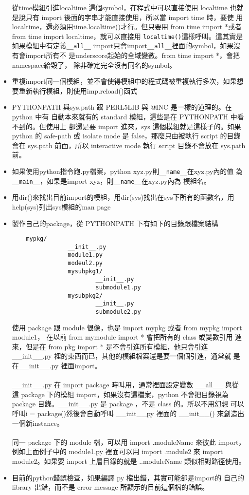 \begin{itemize}
	從time模組引進localtime 這個symbol，在程式中可以直接使用 localtime
	也就是說只有 import 後面的字串才能直接使用，所以當 import time 時，要使
	用 localtime，還必須用time.localtime()才行。但只要用
	from time import *或者from time import localtime，就可以直接用
	\verb=localtime()=這樣呼叫。這其實是如果模組中有定義\verb=__all__=
	import只會import\verb=__all__=裡面的symbol，如果沒有會import所有不
	是underscore起始的全域變數。from time import *，會把namespace給毀了，
        除非確定完全沒有同名的symbol。
\item 重複import同一個模組，並不會使得模組中的程式碼被重複執行多次，如果想
	要重新執行模組，則使用imp.reload()函式
\item PYTHONPATH 與sys.path 跟 PERL5LIB 與 @INC 是一樣的道理的。在 python 中有
        自動本來就有的 standard 模組，這些是在 PYTHONPATH 中看不到的。但使用上
        卻還是要 import 進來，sys 這個模組就是這樣子的。如果 python 的
        safe-path 或 isolate mode 是 false，那麼只由被執行 script 的目錄會在
        sys.path 前面，所以 interactive mode 執行 script 目錄不會放在 sys.path
        前。
\item 如果使用python指令跑.py檔案，python xyz.py則\verb=__name__=在xyz.py內的值
	為\verb=__main__=，如果是import xyz，則\verb=__name__=在xyz.py內為
	模組名。
\item 用dir()來找出目前import的模組，用dir(sys)找出在sys下所有的函數名，用
	help(sys)列出sys模組的man page
\item 製作自己的package，從 PYTHONPATH 下有如下的目錄跟檔案結構
	\begin{verbatim}
	mypkg/
                __init__.py
                module1.py
                modeul2.py
                mysubpkg1/
                        __init__.py
                        submodule1.py
                mysubpkg2/
                        __init__.py
                        submodule2.py
	\end{verbatim}
	使用 package 跟 module 很像，也是 import mypkg 或者 from mypkg import
        module1， 在以前 from mymodule import * 會把所有的 class 或變數引用
        進來，但是在 from pkg import * 是不會引進所有模組，他只會引進
        \_\_init\_\_.py 裡的東西而已，其他的模組檔案還是要一個個引進，通常就
        是在\_\_init\_\_.py 裡面import。
	\\\\
	\_\_init\_\_.py 在 import package 時叫用，通常裡面設定變數 \_\_all\_\_
	與從這 package 下的模組 import，如果沒有這檔案，python 不會把目錄視為
	package 目錄。\_\_init\_\_.py 是 package ，不是 class 的。所以不用幻想
        可以呼叫i = package()然後會自動呼叫 \_\_init\_\_py 裡面的 \_\_init\_\_()
        來創造出一個新instance。
        \\\\
        同一 package 下的 module 檔，可以用 import .moduleName 來彼此 import，
        例如上面例子中的 module1.py 裡面可以用 import .module2 來 import 
        module2。如果要 import 上層目錄的就是 ..moduleName 類似相對路徑使用。
\item 目前的python錯誤檢查，如果編譯 py 檔出錯，其實可能卻是import的
  自己的 library 出錯，而不是 error message 所顯示的目前這個檔的錯誤。
\end{itemize}
